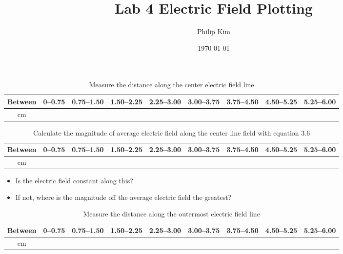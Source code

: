 \documentclass{article}
\title{Lab 4 Electric Field Plotting}
\author{Philip Kim}
\date{\today}
\begin{document}
\maketitle

\begin{table}[h!]
  \begin{center}
    \caption{Measure the distance along the center electric field line}\label{tab:table1}
    \begin{tabular}{|c|c|c|c|c|c|c|c|c|}\hline
      Between & 0--0.75 & 0.75--1.50 & 1.50--2.25 & 2.25--3.00 & 3.00--3.75 & 3.75--4.50 & 4.50--5.25 & 5.25--6.00 \\ \hline
      cm & & & & & & & & \\ \hline
    \end{tabular}
  \end{center}
\end{table}

\begin{table}[h!]
  \begin{center}
    \caption{Calculate the magnitude of average electric field along the center line field with equation 3.6}\label{tab:table1}
    \begin{tabular}{|c|c|c|c|c|c|c|c|c|}\hline
      Between & 0--0.75 & 0.75--1.50 & 1.50--2.25 & 2.25--3.00 & 3.00--3.75 & 3.75--4.50 & 4.50--5.25 & 5.25--6.00 \\ \hline
      cm & & & & & & & & \\ \hline
    \end{tabular}
  \end{center}
\end{table}
\begin{itemize}
  \item Is the electric field constant along this?
  \item If not, where is the magnitude off the average electric field the greatest?
\end{itemize}

\begin{table}[h!]
  \begin{center}
    \caption{Measure the distance along the outermost electric field line}\label{tab:table1}
    \begin{tabular}{|c|c|c|c|c|c|c|c|c|}\hline
      Between & 0--0.75 & 0.75--1.50 & 1.50--2.25 & 2.25--3.00 & 3.00--3.75 & 3.75--4.50 & 4.50--5.25 & 5.25--6.00 \\ \hline
      cm & & & & & & & & \\ \hline
    \end{tabular}
  \end{center}
\end{table}
\end{document}

